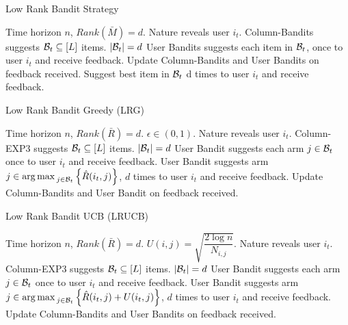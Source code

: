  




\begin{algorithm}[!th]
\caption{Low Rank Bandit Strategy}
\label{alg:mLRBS}
\begin{algorithmic}[1]
 Time horizon $n$, $Rank(\bar{M}) = d$.
\State Nature reveals user $i_t$.  
\State Column-Bandits suggests $\mathcal{B}_t \subseteq [L]$ items. $|\mathcal{B}_t| = d$
\State User Bandits suggests each item in $\mathcal{B}_t$, once to user $i_t$ and receive feedback.
\State Update Column-Bandits and User Bandits on feedback  received.
\Else
\State Suggest best item in $\mathcal{B}_t$ d times to user $i_t$ and receive feedback.
\EndIf
\EndFor
\end{algorithmic}
\end{algorithm}

\begin{algorithm}[!th]
\caption{Low Rank Bandit Greedy (LRG)}
\label{alg:mLRBS1}
\begin{algorithmic}[1]
 Time horizon $n$, $Rank(\bar{R}) = d$.
 $\epsilon\in (0,1)$.
\State Nature reveals user $i_t$.  
\State Column-EXP3 suggests $\mathcal{B}_t\subseteq [L]$ items. $|\mathcal{B}_t| = d$
	 
\State User Bandit suggests each arm $j\in\mathcal{B}_t$ once to user $i_t$ and receive feedback.
\EndFor
{} 
\State User Bandit suggests arm $j\in \operatorname*{arg\,max\,}_{j\in\mathcal{B}_t}\left\lbrace \hat{R}(i_t,j)\right\rbrace$, $d$ times to user $i_t$ and receive feedback.
\EndFor
\State Update Column-Bandits and User Bandit on feedback received.
\EndFor
\end{algorithmic}
\end{algorithm}


\begin{algorithm}[!th]
\caption{Low Rank Bandit UCB (LRUCB)}
\label{alg:mLRBS2}
\begin{algorithmic}[1]
 Time horizon $n$, $Rank(\bar{R}) = d$.
 $U(i,j) = \sqrt{\dfrac{2\log n}{N_{i,j}}}$.
\State Nature reveals user $i_t$.  
\State Column-EXP3 suggests $\mathcal{B}_t\subseteq [L]$ items. $|\mathcal{B}_t| = d$
	 
\State User Bandit suggests each arm $j\in\mathcal{B}_t$ once to user $i_t$ and receive feedback.
\Else {}
\State User Bandit suggests arm $j\in \operatorname*{arg\,max\,}_{j\in\mathcal{B}_t}\left\lbrace \hat{R}(i_t,j) + U(i_t,j)\right\rbrace$, $d$ times to user $i_t$ and receive feedback.
\EndIf
\State Update Column-Bandits and User Bandits on feedback received.
\EndFor
\end{algorithmic}
\end{algorithm}

